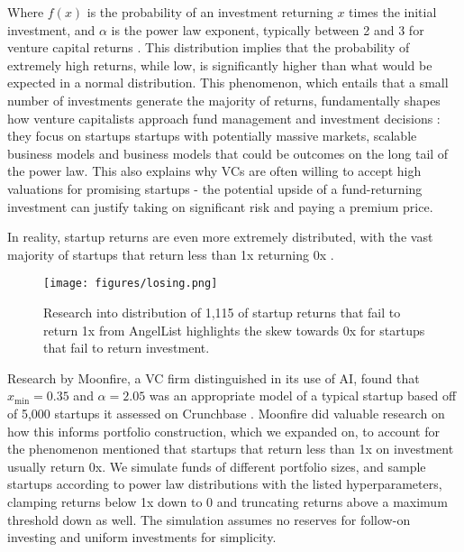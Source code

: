 \documentclass[a4paper, oneside]{discothesis}
\begin{document}
Where $f(x)$ is the probability of an investment returning $x$ times the initial investment, and $\alpha$ is the power law exponent, typically between 2 and 3 for venture capital returns \cite{clauset2009power}. This distribution implies that the probability of extremely high returns, while low, is significantly higher than what would be expected in a normal distribution. This phenomenon, which entails that a small number of investments generate the majority of returns, fundamentally shapes how venture capitalists approach fund management and investment decisions \cite{peter2015power}: they focus on startups startups with potentially massive markets, scalable business models and business models that could be outcomes on the long tail of the power law. This also explains why VCs are often willing to accept high valuations for promising startups - the potential upside of a fund-returning investment can justify taking on significant risk and paying a premium price.

In reality, startup returns are even more extremely distributed, with the vast majority of startups that return less than 1x returning 0x \cite{othman2019startup}.
\begin{figure}[htbp]
    \centering
    \texttt{[image: figures/losing.png]}
    \caption{Research into distribution of 1,115 of startup returns that fail to return 1x from AngelList highlights the skew towards 0x for startups that fail to return investment. \cite{othman2022howmuchcanyouloseonafailedstartupinvestment}}
    \label{fig:startup_returns_distribution}
\end{figure}

\pagebreak

Research by Moonfire, a VC firm distinguished in its use of AI, found that $x_{\text{min}} = 0.35$ and $\alpha = 2.05$ was an appropriate model of a typical 
startup based off of 5,000 startups it assessed on Crunchbase \cite{farina_arpaia_2023_venture_capital_portfolio_construction}. Moonfire did valuable research on how this informs portfolio construction, which we expanded on, to account for the phenomenon mentioned that startups that return less than 1x on investment usually return 0x. We simulate funds of different portfolio sizes, and sample startups according to power law distributions with the listed hyperparameters, clamping returns below 1x down to 0 and truncating returns above a maximum threshold down as well. The simulation assumes no reserves for follow-on investing and uniform investments for simplicity.
\end{document}
